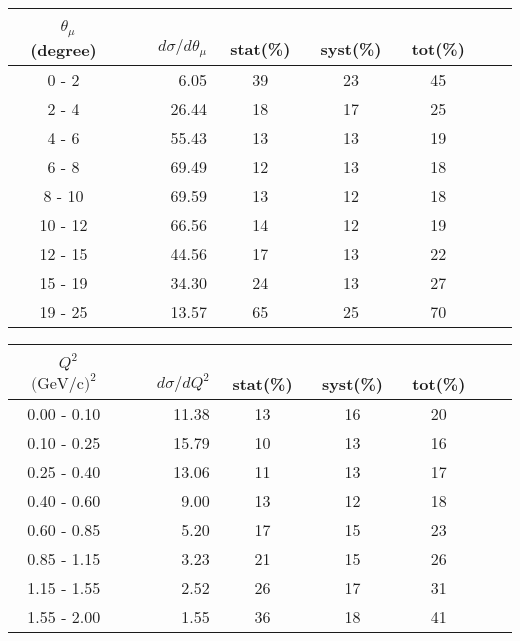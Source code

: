 \documentclass[aps, prd, reprint,showpacs,  preprintnumbers,amsmath,amssymb,superscriptaddress, nofootinbib]{revtex4-1}
\makeatletter
\renewenvironment{table}
  {\def\@captype{table}}
  {}
\makeatother
\begin{document}
\begin{table}
\centering
\begin{tabular}{crccccc}
\hline
~$\theta_{\mu}$ (degree) &~~~ $d\sigma/d\theta_{\mu}$ &~ stat(\%) &~ syst(\%) &~ tot(\%)  \\
\hline
 0 - 2  &   6.05   & 39 & 23 & 45 \\ 
 2 - 4  &  26.44   & 18 & 17 & 25 \\ 
 4 - 6  &  55.43   & 13 & 13 & 19 \\ 
 6 - 8  &  69.49   & 12 & 13 & 18 \\ 
 8 - 10 &  69.59   & 13 & 12 & 18 \\ 
10 - 12 &  66.56   & 14 & 12 & 19 \\ 
12 - 15 &  44.56   & 17 & 13 & 22 \\ 
15 - 19 &  34.30   & 24 & 13 & 27 \\ 
19 - 25 &  13.57   & 65 & 25 & 70 \\ 
\hline
\hline
\end{tabular}
\caption{ Flux-averaged differential cross section in muon angle 
$\theta_\mu$, $d\sigma/d\theta_{\mu}(10^{-42}\text{cm}^2/\text{nucleon}/\text{degree})$, 
for 1$\pi^0$ production with statistical, systematic, and total uncertainties.}
\label{tb:pi0muth}
\end{table}
\vskip 2pt

\begin{table}
\centering
\begin{tabular}{crccccc}
\hline
~$Q^2$ $\text{(GeV/c)}^2$ &~~~ $d\sigma/dQ^2$ &~ stat(\%) &~ syst(\%) &~ tot(\%)  \\
\hline
 0.00 -  0.10 & 11.38  & 13 & 16 & 20 \\ 
 0.10 -  0.25 & 15.79  & 10 & 13 & 16 \\ 
 0.25 -  0.40 & 13.06  & 11 & 13 & 17 \\ 
 0.40 -  0.60 &  9.00  & 13 & 12 & 18 \\ 
 0.60 -  0.85 &  5.20  & 17 & 15 & 23 \\ 
 0.85 -  1.15 &  3.23  & 21 & 15 & 26 \\ 
 1.15 -  1.55 &  2.52  & 26 & 17 & 31 \\ 
 1.55 -  2.00 &  1.55  & 36 & 18 & 41 \\ 
\hline
\hline
\end{tabular}
\caption{ Flux-averaged differential cross section in $Q^2$, 
$d\sigma/dQ^2 (10^{-40}\text{cm}^2/\text{nucleon}/(\text{GeV/c})^2)$, 
for 1$\pi^0$ production with statistical, systematic, and total uncertainties.}
\label{tb:pi0Q2}
\end{table}
\vskip 2pt
\end{document}
